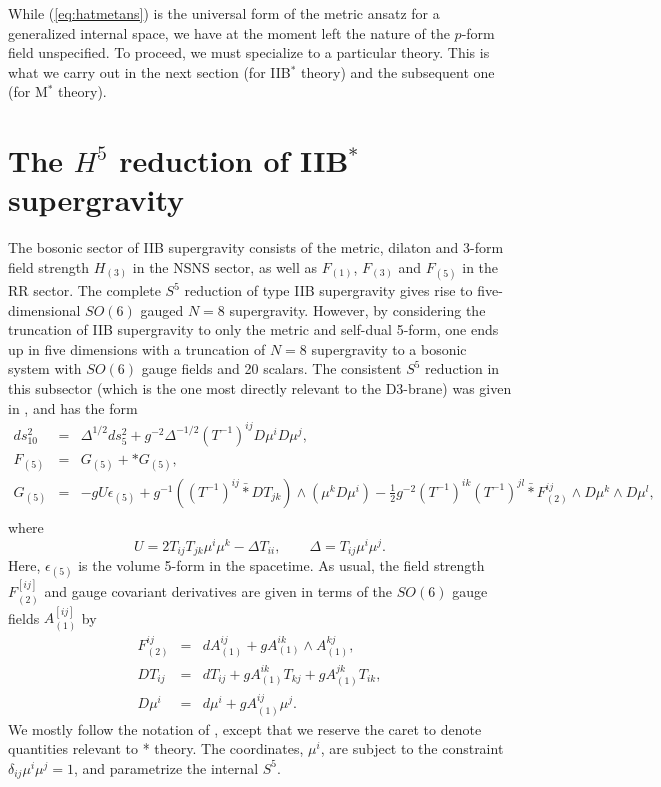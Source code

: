 \documentclass[a4paper,12pt]{article}
\begin{document}
While (\ref{eq:hatmetans}) is the universal form of the metric ansatz
for a generalized internal space, we have at the moment left the nature
of the $p$-form field unspecified.  To proceed, we must specialize to
a particular theory.  This is what we carry out in the next section
(for IIB$^*$ theory) and the subsequent one (for M$^*$ theory).

\section{The $H^5$ reduction of IIB$^*$ supergravity}

The bosonic sector of IIB supergravity consists of the metric, dilaton
and 3-form field strength $H_{(3)}$ in the NSNS sector, as well as
$F_{(1)}$, $F_{(3)}$ and $F_{(5)}$ in the RR sector.  The complete
$S^5$ reduction of type IIB supergravity gives rise to five-dimensional
$SO(6)$ gauged $N=8$ supergravity.  However, by considering the
truncation of IIB supergravity to only the metric and self-dual 5-form,
one ends up in five dimensions with a truncation of $N=8$ supergravity
to a bosonic system with $SO(6)$ gauge fields and 20 scalars.  The
consistent $S^5$ reduction in this subsector (which is the one most
directly relevant to the D3-brane) was given in \cite{Cvetic2}, and has
the form
%
\begin{eqnarray}
ds_{10}^2&=&\Delta^{1/2}ds_5^2+g^{-2}\Delta^{-1/2}(T^{-1})^{ij}D\mu^iD\mu^j,
\nonumber\\
F_{(5)}&=&G_{(5)}+\ast G_{(5)},\nonumber\\
G_{(5)}&=&-gU\epsilon_{(5)}+g^{-1}((T^{-1})^{ij}\bar{\ast} DT_{jk})
\wedge(\mu^kD\mu^i)
-\frac{1}{2}g^{-2}(T^{-1})^{ik}(T^{-1})^{jl}\bar{\ast} F^{ij}_{(2)}
\wedge D\mu^k \wedge D\mu^l,\nonumber\\
\label{eq:ads5s5}
\end{eqnarray}
%
where
%
\begin{equation}
U=2T_{ij}T_{jk} \mu^i \mu^k -\Delta T_{ii},\qquad
\Delta=T_{ij}\mu^i \mu^j.
\end{equation}
%
Here, $\epsilon_{(5)}$ is the volume 5-form in the spacetime.
As usual, the field strength $F_{(2)}^{[ij]}$ and gauge covariant
derivatives are given in terms of the $SO(6)$ gauge fields $A_{(1)}^{[ij]}$
by
%
\begin{eqnarray}
F^{ij}_{(2)}&=&dA^{ij}_{(1)}+gA^{ik}_{(1)}\wedge A^{kj}_{(1)},\nonumber\\
DT_{ij}&=&dT_{ij}+gA^{ik}_{(1)}T_{kj}+gA^{jk}_{(1)}T_{ik},\nonumber\\
D\mu^i&=&d\mu^i + gA^{ij}_{(1)}\mu^j.
\label{eq:Ddef}
\end{eqnarray}
%
We mostly follow the notation of \cite{Cvetic2}, except that we
reserve the caret to denote quantities relevant to * theory.
The coordinates, $\mu^i$, are subject to the constraint
$\delta_{ij}\mu^i\mu^j=1$, and parametrize the internal $S^5$.
\end{document}
